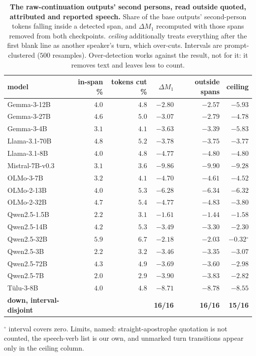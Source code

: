 \begin{table}[t]\centering\small
\caption{\textbf{The raw-continuation outputs' second persons, read outside quoted, attributed and reported speech.} Share of the base outputs' second-person tokens falling inside a detected span, and $\Delta M_1$ recomputed with those spans removed from both checkpoints. \emph{ceiling} additionally treats everything after the first blank line as another speaker's turn, which over-cuts. Intervals are prompt-clustered ($500$ resamples). Over-detection works against the result, not for it: it removes text and leaves less to count.}
\label{tab:konusma}
\begin{tabular}{lrrrrr}\toprule
model & in-span \% & tokens cut \% & $\Delta M_1$ & outside spans & ceiling \\
\midrule
Gemma-3-12B & $4.0$ & $4.8$ & $-2.80$ & $-2.57$ & $-5.93$ \\
Gemma-3-27B & $4.6$ & $5.0$ & $-3.07$ & $-2.79$ & $-4.78$ \\
Gemma-3-4B & $3.1$ & $4.1$ & $-3.63$ & $-3.39$ & $-5.83$ \\
Llama-3.1-70B & $4.8$ & $5.2$ & $-3.78$ & $-3.75$ & $-3.77$ \\
Llama-3.1-8B & $4.0$ & $4.8$ & $-4.77$ & $-4.80$ & $-4.80$ \\
Mistral-7B-v0.3 & $3.1$ & $3.6$ & $-9.86$ & $-9.90$ & $-9.28$ \\
OLMo-3-7B & $3.2$ & $4.1$ & $-4.70$ & $-4.61$ & $-4.52$ \\
OLMo-2-13B & $4.0$ & $5.3$ & $-6.28$ & $-6.34$ & $-6.32$ \\
OLMo-2-32B & $4.7$ & $5.4$ & $-4.77$ & $-4.83$ & $-3.80$ \\
Qwen2.5-1.5B & $2.2$ & $3.1$ & $-1.61$ & $-1.44$ & $-1.58$ \\
Qwen2.5-14B & $4.2$ & $5.3$ & $-3.49$ & $-3.30$ & $-2.30$ \\
Qwen2.5-32B & $5.9$ & $6.7$ & $-2.18$ & $-2.03$ & $-0.32$$^{\circ}$ \\
Qwen2.5-3B & $2.2$ & $3.2$ & $-3.46$ & $-3.35$ & $-3.07$ \\
Qwen2.5-72B & $4.3$ & $4.9$ & $-3.69$ & $-3.60$ & $-2.98$ \\
Qwen2.5-7B & $2.0$ & $2.9$ & $-3.90$ & $-3.83$ & $-2.82$ \\
T\"ulu-3-8B & $4.0$ & $4.8$ & $-8.71$ & $-8.78$ & $-8.55$ \\
\midrule
\textbf{down, interval-disjoint} & & & \textbf{16/16} & \textbf{16/16} & \textbf{15/16} \\
\bottomrule\end{tabular}
\par\smallskip\footnotesize $^{\circ}$ interval covers zero. Limits, named: straight-apostrophe quotation is not counted, the speech-verb list is our own, and unmarked turn transitions appear only in the ceiling column.
\end{table}
